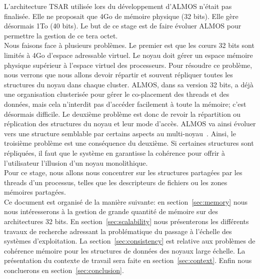  L'architecture TSAR utilisée lors du développement d'ALMOS n'était pas
  finalisée. Elle ne proposait que 4Go de mémoire physique (32 bits). Elle gère
  désormais 1To (40 bits). Le but de ce stage est de faire évoluer ALMOS pour
  permettre la gestion de ce tera octet.\\

  Nous faisons face à plusieurs problèmes. Le premier est que les c\oe urs 32
  bits sont limités à 4Go d'espace adressable virtuel. Le noyau doit gérer un
  espace mémoire physique supérieur à l'espace virtuel des processeurs. Pour
  résoudre ce problème, nous verrons que nous allons devoir répartir et souvent
  répliquer toutes les structures du noyau dans chaque cluster. ALMOS, dans sa
  version 32 bits, a déjà une organisation clusterisée pour gérer le
  co-placement des threads et des données, mais cela n'interdit pas d'accéder
  facilement à toute la mémoire; c'est désormais difficile. Le deuxième problème
  est donc de revoir la répartition ou réplication des structures du noyau et
  leur mode d'accès. ALMOS va ainsi évoluer vers une structure semblable par
  certains aspects au multi-noyau~\citep{baumann2009multikernel}. Ainsi, le
  troisième problème est une conséquence du deuxième. Si certaines structures
  sont répliquées, il faut que le système en garantisse la cohérence pour offrir
  à l'utilisateur l'illusion d'un noyau monolithique. \\

  Pour ce stage, nous allons nous concentrer sur les structures partagées par
  les threads d'un processus, telles que les descripteurs de fichiers ou les
  zones mémoires partagées. \\

  Ce document est organisé de la manière suivante: en section~\ref{sec:memory}
  nous nous intéresserons à la gestion de grande quantité de mémoire sur des
  architectures 32 bits. En section~\ref{sec:scalability} nous présenterons les
  différents travaux de recherche adressant la problématique du passage à
  l'échelle des systèmes d'exploitation.  La section~\ref{sec:consistency} est
  relative aux problèmes de cohérence mémoire pour les structures de données des
  noyaux large échelle. La présentation du contexte de travail sera faite en
  section~\ref{sec:context}. Enfin nous concluerons en
  section~\ref{sec:conclusion}.\newline
